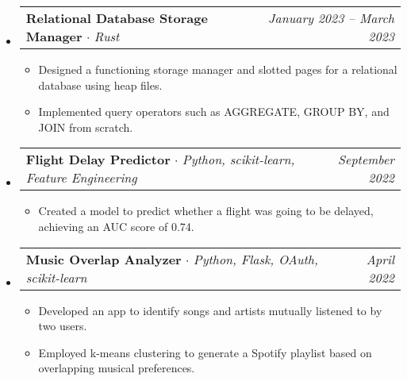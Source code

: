 \documentclass[letterpaper,11pt]{article}
\makeatletter
\newcommand{\resumeItem}[1]{
  \item\small{
    {#1 \vspace{-2pt}}
  }
}
\newcommand{\resumeProjectHeading}[2]{
    \item
    \begin{tabular*}{0.97\textwidth}{l@{\extracolsep{\fill}}r}
      \small#1 & #2 \\
    \end{tabular*}\vspace{-7pt}
}
\newcommand{\resumeSubHeadingListStart}{\begin{itemize}[leftmargin=0.125in, label={}]}
\newcommand{\resumeSubHeadingListEnd}{\end{itemize}}
\newcommand{\resumeItemListStart}{\begin{itemize}[leftmargin=0.185in]
}
\newcommand{\resumeItemListEnd}{\end{itemize}\vspace{-5pt}}
\makeatother
\begin{document}
\resumeSubHeadingListStart
      
      \resumeProjectHeading
          {\textbf{Relational Database Storage Manager} $\cdot$ \emph{Rust}}{\emph{January 2023 -- March 2023}}
          \resumeItemListStart
             \resumeItem{Designed a functioning storage manager and slotted pages for a relational database using heap files.}
        \resumeItem{Implemented query operators such as AGGREGATE, GROUP BY, and JOIN from scratch.}
          \resumeItemListEnd

      \resumeProjectHeading
          {\textbf{Flight Delay Predictor} $\cdot$ \emph{Python, scikit-learn, Feature Engineering}}{\emph{September 2022}}
          \resumeItemListStart
            \resumeItem{Created a model to predict whether a flight was going to be delayed, achieving an AUC score of 0.74.}
            \resumeItemListEnd


    \resumeProjectHeading
          {\textbf{Music Overlap Analyzer} $\cdot$ \emph{Python, Flask, OAuth, scikit-learn}}{\emph{April 2022}}
          \resumeItemListStart
             \resumeItem{Developed an app to identify songs and artists mutually listened to by two users.}
            \resumeItem{Employed k-means clustering to generate a Spotify playlist based on overlapping musical preferences.}
          \resumeItemListEnd
\resumeSubHeadingListEnd

  
\end{document}

